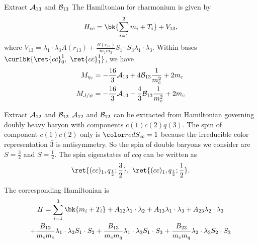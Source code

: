 \begin{frame}{Extract $\mathcal{A}_{13}$ and $\mathcal{B}_{13}$}
    The Hamiltonian for charmonium is given by
    \begin{equation}
        H_{c\bar{c}} = \bk{\sum_{i=1}^{2}m_{i}+T_{i}} + V_{13},
    \end{equation}
    where $V_{13}=\lambda_{1}\cdot\lambda_{3}A(r_{13})+\frac{B(r_{13})}{m_{1}m_{3}}S_{1}\cdot S_{3}\lambda_{1}\cdot\lambda_{3}$. Within bases $\curlbk{\ret{c\bar{c}}^{1}_{0},\ \ret{c\bar{c}}^{1}_{1}}$, we have
    \begin{align}
        M_{\eta_{c}} & = -\frac{16}{3}\mathcal{A}_{13} + 4\mathcal{B}_{13}\frac{1}{m_{c}^{2}} + 2m_{c}       \\
        M_{J/\psi}   & = -\frac{16}{3}\mathcal{A}_{13}-\frac{4}{3}\mathcal{B}_{13}\frac{1}{m_{c}^{2}}+2m_{c}
    \end{align}
\end{frame}
\begin{frame}{Extract $\mathcal{A}_{12}$ and $\mathcal{B}_{12}$}
    $\mathcal{A}_{12}$ and $\mathcal{B}_{12}$ can be extracted from Hamiltonian governing doubly heavy baryon with components $c(1)c(2)q(3)$. The spin of component $c(1)c(2)$ only is $\redtext{S_{cc}=1}$ because the irreducible color representation $\bar{3}$ is antisymmetry. So the spin of double baryons we consider are $S=\frac{3}{2}$ and $S=\frac{1}{2}$. The spin eigenstates of $ccq$ can be written as 
    \begin{equation}\label{Eq:spineigen}
        \ret{(cc)_{1},q_{\frac{1}{2}};\frac{3}{2}},\ \ret{(cc)_{1},q_{\frac{1}{2}};\frac{1}{2}}.
    \end{equation}


    The corresponding Hamiltonian is
    \begin{multline}\label{Eq:Hamccq}
        H = \sum_{i=1}^{3}\bk{m_{i}+T_{i}} + A_{12}\lambda_{1}\cdot\lambda_{2} + A_{13}\lambda_{1}\cdot\lambda_{3} + A_{23}\lambda_{2}\cdot\lambda_{3}\\
        + \frac{B_{12}}{m_{c}m_{c}}\lambda_{1}\cdot\lambda_{2}S_{1}\cdot S_{2} + \frac{B_{13}}{m_{c}m_{q}}\lambda_{1}\cdot\lambda_{3}S_{1}\cdot S_{3} + \frac{B_{23}}{m_{c}m_{q}}\lambda_{2}\cdot\lambda_{3}S_{2}\cdot S_{3}
    \end{multline}
\end{frame}
